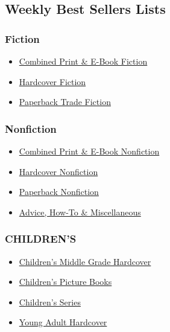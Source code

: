 \hypertarget{weekly-best-sellers-lists}{%
\subsection{Weekly Best Sellers Lists}\label{weekly-best-sellers-lists}}

\hypertarget{fiction}{%
\subsubsection{Fiction}\label{fiction}}

\begin{itemize}
\tightlist
\item
  \href{/books/best-sellers/combined-print-and-e-book-fiction/}{Combined
  Print \& E-Book Fiction}
\item
  \href{/books/best-sellers/hardcover-fiction/}{Hardcover Fiction}
\item
  \href{/books/best-sellers/trade-fiction-paperback/}{Paperback Trade
  Fiction}
\end{itemize}

\hypertarget{nonfiction}{%
\subsubsection{Nonfiction}\label{nonfiction}}

\begin{itemize}
\tightlist
\item
  \href{/books/best-sellers/combined-print-and-e-book-nonfiction/}{Combined
  Print \& E-Book Nonfiction}
\item
  \href{/books/best-sellers/hardcover-nonfiction/}{Hardcover Nonfiction}
\item
  \href{/books/best-sellers/paperback-nonfiction/}{Paperback Nonfiction}
\item
  \href{/books/best-sellers/advice-how-to-and-miscellaneous/}{Advice,
  How-To \& Miscellaneous}
\end{itemize}

\hypertarget{childrens}{%
\subsubsection{CHILDREN'S}\label{childrens}}

\begin{itemize}
\tightlist
\item
  \href{/books/best-sellers/childrens-middle-grade-hardcover/}{Children's
  Middle Grade Hardcover}
\item
  \href{/books/best-sellers/picture-books/}{Children's Picture Books}
\item
  \href{/books/best-sellers/series-books/}{Children's Series}
\item
  \href{/books/best-sellers/young-adult-hardcover/}{Young Adult
  Hardcover}
\end{itemize}

